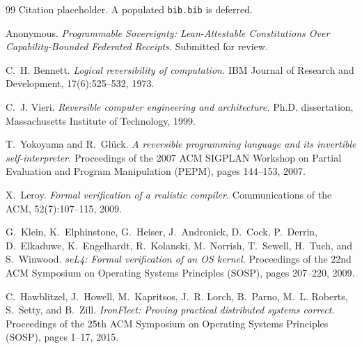 \documentclass[11pt,letterpaper]{article}
\begin{document}

\begin{thebibliography}{99}
  Citation placeholder. A populated \texttt{bib.bib} is deferred.

Anonymous.
\emph{Programmable Sovereignty: Lean-Attestable Constitutions Over
Capability-Bounded Federated Receipts.}
Submitted for review.

C.~H. Bennett.
\emph{Logical reversibility of computation.}
IBM Journal of Research and Development, 17(6):525--532, 1973.

C.~J. Vieri.
\emph{Reversible computer engineering and architecture.}
Ph.D. dissertation, Massachusetts Institute of Technology, 1999.

T.~Yokoyama and R.~Gl\"uck.
\emph{A reversible programming language and its invertible
self-interpreter.}
Proceedings of the 2007 ACM SIGPLAN Workshop on Partial Evaluation and
Program Manipulation (PEPM), pages 144--153, 2007.

X.~Leroy.
\emph{Formal verification of a realistic compiler.}
Communications of the ACM, 52(7):107--115, 2009.

G.~Klein, K.~Elphinstone, G.~Heiser, J.~Andronick, D.~Cock, P.~Derrin,
D.~Elkaduwe, K.~Engelhardt, R.~Kolanski, M.~Norrish, T.~Sewell,
H.~Tuch, and S.~Winwood.
\emph{seL4: Formal verification of an OS kernel.}
Proceedings of the 22nd ACM Symposium on Operating Systems Principles
(SOSP), pages 207--220, 2009.

C.~Hawblitzel, J.~Howell, M.~Kapritsos, J.~R. Lorch, B.~Parno,
M.~L. Roberts, S.~Setty, and B.~Zill.
\emph{IronFleet: Proving practical distributed systems correct.}
Proceedings of the 25th ACM Symposium on Operating Systems Principles
(SOSP), pages 1--17, 2015.
\end{thebibliography}
\end{document}
